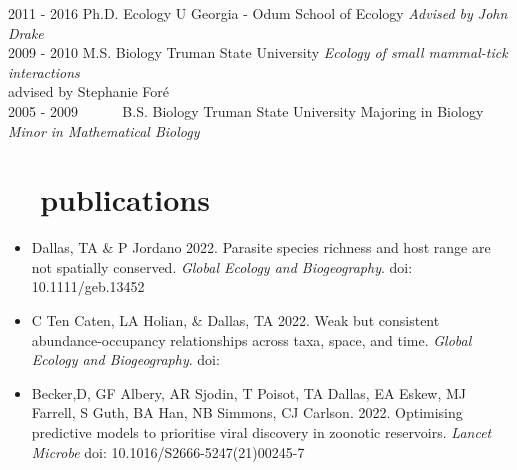 \documentclass[]{CV}
\begin{document}
\begin{entrylist}
  \entry
    {2011 - 2016}
    {\normalfont Ph.D. Ecology}
    {U Georgia - Odum School of Ecology}
    {\emph{Advised by John Drake}}\\

  \entry
    {2009 - 2010}
    {M.S. Biology}
    {Truman State University}
    {\emph{Ecology of small mammal-tick interactions} \\ advised by Stephanie For\'e}\\

 \entry
    {2005 - 2009 \ \ \ \ \ }
    {B.S. Biology}
    {Truman State University}
    {Majoring in Biology\\
    \emph{Minor in Mathematical Biology}}\\
\end{entrylist}














\section{\faBook \ \  publications}


{}

\begin{itemize}

\item {\mefont Dallas, TA} \& P Jordano 2022. Parasite species richness and host range are not spatially conserved. \textit{Global Ecology and Biogeography}. doi: 10.1111/geb.13452

\item C Ten Caten, LA Holian, \& {\mefont Dallas, TA} 2022. Weak but consistent abundance-occupancy relationships across taxa, space, and time. \textit{Global Ecology and Biogeography}. doi: 

\item Becker,D, GF Albery, AR Sjodin, T Poisot, {\mefont TA Dallas}, EA Eskew, MJ Farrell, S Guth, BA Han, NB Simmons, CJ Carlson. 2022. Optimising predictive models to prioritise viral discovery in
zoonotic reservoirs. \textit{Lancet Microbe} doi: 10.1016/S2666-5247(21)00245-7



\end{itemize}
\end{document}
